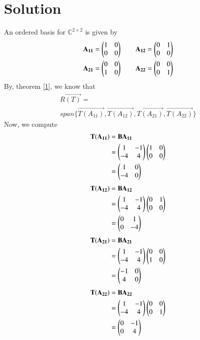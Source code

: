 \documentclass[journal,12pt,twocolumn]{IEEEtran}
\begin{document}
\section{Solution}
An ordered basis for $\mathbb{C}^{2\times2}$ is given by
\begin{align}
& \mathbf{A_{11}} = \begin{pmatrix}1 & 0 \\ 0 & 0\end{pmatrix} \qquad \mathbf{A_{12}} = \begin{pmatrix}0 & 1 \\ 0 & 0\end{pmatrix} \\
& \mathbf{A_{21}} = \begin{pmatrix}0 & 0 \\ 1 & 0\end{pmatrix} \qquad \mathbf{A_{22}} = \begin{pmatrix}0 & 0 \\ 0 & 1\end{pmatrix}
\end{align}
By, theorem \eqref{1}, we know that
\begin{multline}
R\vec{(T)} = \\ span\{\vec{T(A_{11})}, \vec{T(A_{12})},\vec{T(A_{21})},\vec{T(A_{22})}\} \label{2}	
\end{multline}
Now, we compute
\begin{align}  
\mathbf{T(A_{11})} & = \mathbf{BA_{11}} \\
                & = \begin{pmatrix}1 & -1 \\ -4 & 4\end{pmatrix}\begin{pmatrix}1 & 0 \\ 0 & 0\end{pmatrix} \\
                & = \begin{pmatrix}1 & 0 \\ -4 & 0\end{pmatrix} \label{3}
\end{align}
\begin{align}  
	\mathbf{T(A_{12})} & = \mathbf{BA_{12}} \\
	& = \begin{pmatrix}1 & -1 \\ -4 & 4\end{pmatrix}\begin{pmatrix}0 & 1 \\ 0 & 0\end{pmatrix} \\
	& = \begin{pmatrix}0 & 1 \\ 0 & -4\end{pmatrix} \label{4}
\end{align}
\begin{align}  
	\mathbf{T(A_{21})} & = \mathbf{BA_{21}} \\
	& = \begin{pmatrix}1 & -1 \\ -4 & 4\end{pmatrix}\begin{pmatrix}0 & 0 \\ 1 & 0\end{pmatrix} \\
	& = \begin{pmatrix}-1 & 0 \\ 4 & 0\end{pmatrix} \label{5}
\end{align}
\begin{align}  
	\mathbf{T(A_{22})} & = \mathbf{BA_{22}} \\
	& = \begin{pmatrix}1 & -1 \\ -4 & 4\end{pmatrix}\begin{pmatrix}0 & 0 \\ 0 & 1\end{pmatrix} \\
	& = \begin{pmatrix}0 & -1 \\ 0 & 4\end{pmatrix} \label{6}
\end{align}
\end{document}
